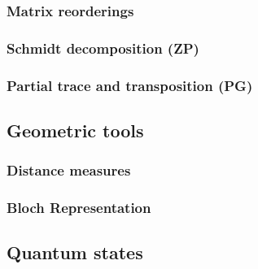 \documentclass[11pt,a4paper]{article}
\begin{document}
\subsubsection{Matrix reorderings}

\subsubsection{Schmidt decomposition (ZP)}

\subsubsection{Partial trace and transposition (PG)}

\subsection{Geometric tools}

\subsubsection{Distance measures}

\subsubsection{Bloch Representation}

\subsection{Quantum states}
\end{document}
